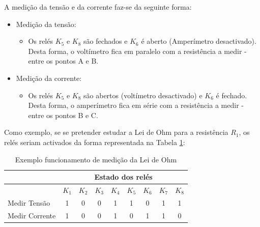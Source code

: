 A medição da tensão e da corrente faz-se da seguinte forma:
\begin{itemize}
	\item Medição da tensão:
	      \begin{itemize}
		      \item Os relés $K_{5}$ e $K_{8}$ são fechados e $K_{6}$ é aberto (Amperímetro desactivado). Desta forma, o voltímetro fica em paralelo com a resistência a medir - entre os pontos A e B.
	      \end{itemize}
	\item Medição da corrente:
	      \begin{itemize}
		      \item Os relés $K_{5}$ e $K_{8}$ são abertos (voltímetro desactivado) e $K_{6}$ é fechado. Desta forma, o amperímetro fica em série com a resistência a medir - entre os pontos B e C.
	      \end{itemize}
\end{itemize}


Como exemplo, se se pretender estudar a Lei de Ohm para a resistência $R_{1}$, os relés seriam activados da forma representada na Tabela \ref{Table:exemplomedicaoohm}:

\begin{table}[htb]
	\centering
	\caption{Exemplo funcionamento de medição da Lei de Ohm} 
	
	\label{Table:exemplomedicaoohm}
	\begin{tabular}{lcccccccc}
		\toprule
		               & \multicolumn{8}{c}{Estado dos relés}                                                                       \\
		\midrule
		               & $K_{1}$                              & $K_{2}$ & $K_{3}$ & $K_{4}$ & $K_{5}$ & $K_{6}$ & $K_{7}$ & $K_{8}$ \\
		\midrule
		Medir Tensão   & 1                                    & 0       & 0       & 1       & 1       & 0       & 1       & 1       \\
		\midrule
		Medir Corrente & 1                                    & 0       & 0       & 1       & 0       & 1       & 1       & 0       \\
		\bottomrule
	\end{tabular}
\end{table}

